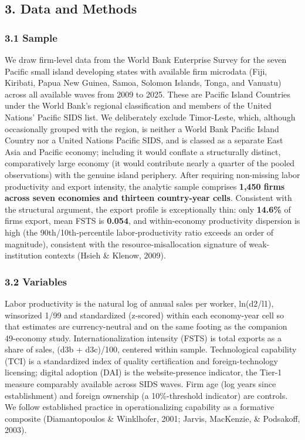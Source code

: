 \documentclass[
  12pt,a4paper]{article}
\begin{document}
\hypertarget{data-and-methods}{%
\subsection{3. Data and Methods}\label{data-and-methods}}

\hypertarget{sample}{%
\subsubsection{3.1 Sample}\label{sample}}

We draw firm-level data from the World Bank Enterprise Survey for the
seven Pacific small island developing states with available firm
microdata (Fiji, Kiribati, Papua New Guinea, Samoa, Solomon Islands,
Tonga, and Vanuatu) across all available waves from 2009 to 2025. These
are Pacific Island Countries under the World Bank's regional
classification and members of the United Nations' Pacific SIDS list. We
deliberately exclude Timor-Leste, which, although occasionally grouped with the region, is neither a World Bank Pacific Island Country nor a
United Nations Pacific SIDS, and is classed as a separate East Asia and
Pacific economy; including it would conflate a structurally distinct,
comparatively large economy (it would contribute nearly a quarter of the
pooled observations) with the genuine island periphery. After requiring
non-missing labor productivity and export intensity, the analytic sample
comprises \textbf{1,450 firms across seven economies and thirteen
country-year cells}. Consistent with the structural argument, the export
profile is exceptionally thin: only \textbf{14.6\%} of firms export,
mean FSTS is \textbf{0.054}, and within-economy productivity dispersion
is high (the 90th/10th-percentile labor-productivity ratio exceeds an
order of magnitude), consistent with the resource-misallocation
signature of weak-institution contexts (Hsieh \& Klenow, 2009).

\hypertarget{variables}{%
\subsubsection{3.2 Variables}\label{variables}}

Labor productivity is the natural log of annual sales per worker,
ln(d2/l1), winsorized 1/99 and standardized (z-scored) within each
economy-year cell so that estimates are currency-neutral and on the same
footing as the companion 49-economy study. Internationalization
intensity (FSTS) is total exports as a share of sales, (d3b + d3c)/100,
centered within sample. Technological capability (TCI) is a standardized
index of quality certification and foreign-technology licensing; digital
adoption (DAI) is the website-presence indicator, the Tier-1 measure
comparably available across SIDS waves. Firm age (log years since
establishment) and foreign ownership (a 10\%-threshold indicator) are
controls. We follow established practice in operationalizing capability
as a formative composite (Diamantopoulos \& Winklhofer, 2001; Jarvis,
MacKenzie, \& Podsakoff, 2003).
\end{document}
